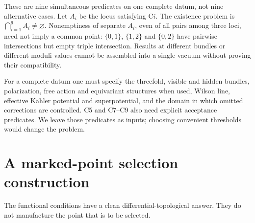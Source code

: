 These are nine simultaneous predicates on one complete datum, not nine
alternative cases. Let $A_i$ be the locus satisfying C$i$. The existence
problem is $\bigcap_{i=1}^9 A_i\ne\varnothing$. Nonemptiness of separate
$A_i$, even of all pairs among three loci, need not imply a common point:
$\{0,1\}$, $\{1,2\}$ and $\{0,2\}$ have pairwise intersections but empty
triple intersection. Results at different bundles or different moduli
values cannot be assembled into a single vacuum without proving their
compatibility.

For a complete datum one must specify the threefold, visible and hidden
bundles, polarization, free action and equivariant structures when used,
Wilson line, effective K\"ahler potential and superpotential, and the
domain in which omitted corrections are controlled. C5 and C7--C9 also
need explicit acceptance predicates. We leave those predicates as inputs;
choosing convenient thresholds would change the problem.

\section{A marked-point selection construction}
The functional conditions have a clean differential-topological answer.
They do not manufacture the point that is to be selected.

